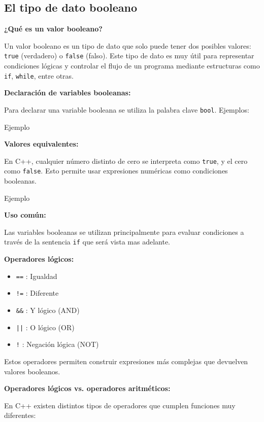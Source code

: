 \documentclass{article}
\newcommand{\cppfile}[2][]{
    \begin{container}{\faCode \space \space  #1}
        
    \end{container}
}
\begin{document}
\subsection{El tipo de dato booleano}

\textbf{¿Qué es un valor booleano?}

Un valor booleano es un tipo de dato que solo puede tener dos posibles valores: \texttt{true} (verdadero) o \texttt{false} (falso). Este tipo de dato es muy útil para representar condiciones lógicas y controlar el flujo de un programa mediante estructuras como \texttt{if}, \texttt{while}, entre otras.

\textbf{Declaración de variables booleanas:}

Para declarar una variable booleana se utiliza la palabra clave \texttt{bool}. Ejemplos:

\cppfile[Ejemplo]{codes/booleano1.cpp}

\textbf{Valores equivalentes:}

En C++, cualquier número distinto de cero se interpreta como \texttt{true}, y el cero como \texttt{false}. Esto permite usar expresiones numéricas como condiciones booleanas.

\cppfile[Ejemplo]{codes/booleano3.cpp}

\vspace{1.5cm}

\vspace{1.5cm}


\textbf{Uso común:}

Las variables booleanas se utilizan principalmente para evaluar condiciones a través de la sentencia \texttt{if} que será vista mas adelante.


\textbf{Operadores lógicos:}
\begin{itemize}
    \item \texttt{==}  : Igualdad
    \item \texttt{!=}  : Diferente
    \item \texttt{\&\&} : Y lógico (AND)
    \item \texttt{||}  : O lógico (OR)
    \item \texttt{!}   : Negación lógica (NOT)
\end{itemize}

Estos operadores permiten construir expresiones más complejas que devuelven valores booleanos.

\textbf{Operadores lógicos vs. operadores aritméticos:}

En C++ existen distintos tipos de operadores que cumplen funciones muy diferentes:
\end{document}
